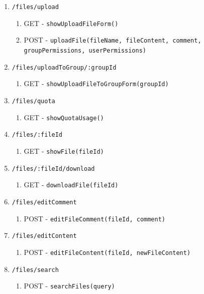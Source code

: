 \documentclass[12pt,DIV14,BCOR10mm,a4paper,parskip=half-,headsepline,headinclude,english,ngerman,bibliography=totocnumbered]{scrreprt}
\begin{document}
\begin{enumerate}
\begin{enumerate}
\begin{enumerate}
      \item \texttt{/files/upload}
      \begin{enumerate}
        \item GET - \texttt{showUploadFileForm()}
        \item POST - \texttt{uploadFile(fileName, fileContent, comment,\\groupPermissions, userPermissions)}
      \end{enumerate}

      \item \texttt{/files/uploadToGroup/:groupId}
      \begin{enumerate}
        \item GET - \texttt{showUploadFileToGroupForm(groupId)}
      \end{enumerate}
      \item \texttt{/files/quota}
      \begin{enumerate}
        \item GET - \texttt{showQuotaUsage()}
      \end{enumerate}
      \item \texttt{/files/:fileId}
      \begin{enumerate}
        \item GET - \texttt{showFile(fileId)}
      \end{enumerate}
      \item \texttt{/files/:fileId/download}
      \begin{enumerate}
        \item GET - \texttt{downloadFile(fileId)}
      \end{enumerate}
      \item \texttt{/files/editComment}
      \begin{enumerate}
        \item POST - \texttt{editFileComment(fileId, comment)}
      \end{enumerate}
      \item \texttt{/files/editContent}
      \begin{enumerate}
        \item POST - \texttt{editFileContent(fileId, newFileContent)}
      \end{enumerate}
      \item \texttt{/files/search}
      \begin{enumerate}
        \item POST - \texttt{searchFiles(query)}
      \end{enumerate}
    \end{enumerate}


\end{enumerate}
\end{enumerate}
\end{document}
